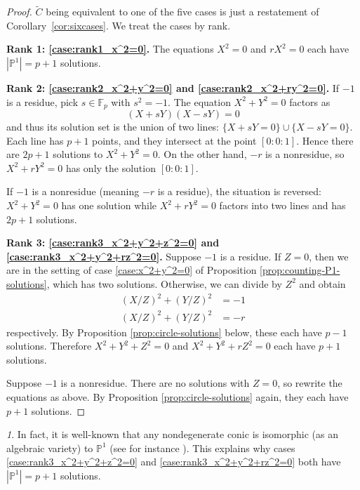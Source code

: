 \documentclass[10pt,a4paper]{amsart}
\numberwithin{equation}{section}
\numberwithin{figure}{section}
\numberwithin{table}{section}
\theoremstyle{definition}
\theoremstyle{plain}
\theoremstyle{remark}
\newtheorem*{rem*}{\protect\remarkname}
\theoremstyle{plain}
\theoremstyle{definition}
\theoremstyle{plain}
\theoremstyle{plain}
\providecommand{\remarkname}{Remark}
\renewcommand{\P}{\mathbb{P}}
\newcommand{\F}{\mathbb{F}}
\begin{document}
	\begin{proof}
		$\widetilde{C}$ being equivalent to one of the five cases is just a restatement of Corollary~\ref{cor:sixcases}. We treat the cases by rank.
		
		\noindent
		\textbf{Rank 1: \eqref{case:rank1_x^2=0}.}
		The equations $X^2 = 0$ and $rX^2 = 0$ each have $|\P^1|=p + 1$ solutions.
		
		\noindent
		\textbf{Rank 2: \eqref{case:rank2_x^2+y^2=0} and \eqref{case:rank2_x^2+ry^2=0}.} 
		If $-1$ is a residue, pick $s\in \F_p$ with $s^2 = -1$. The equation $X^2 + Y^2 = 0$ factors as
		\[
			(X + sY)(X - sY) = 0
		\]
		and thus its solution set is the union of two lines: $\{X + sY = 0\} \cup \{X - sY = 0\}$. Each line has $p+1$ points, and they intersect at the point $[0:0:1]$. Hence there are $2p+1$ solutions to $X^2 + Y^2 = 0$. On the other hand, $-r$ is a nonresidue, so $X^2 + rY^2 = 0$ has only the solution $[0:0:1]$.
		
		If $-1$ is a nonresidue (meaning $-r$ is a residue), the situation is reversed: $X^2 + Y^2 = 0$ has one
		solution while $X^2 + rY^2 = 0$ factors into two lines and has $2p + 1$ solutions.
		
		\noindent
		\textbf{Rank 3: \eqref{case:rank3_x^2+y^2+z^2=0} and \eqref{case:rank3_x^2+y^2+rz^2=0}.} 
		Suppose $-1$ is a residue. If $Z = 0$, then we are in the setting of case \eqref{case:x^2+y^2=0} of
		Proposition \ref{prop:counting-P1-solutions}, which has two
		solutions. Otherwise, we can divide by $Z^2$ and obtain 
		\begin{align*} 
		(X/Z)^2 + (Y/Z)^2 &= -1 \\ 
		(X/Z)^2 + (Y/Z)^2 &= -r 
		\end{align*} 
		respectively. By Proposition \ref{prop:circle-solutions} below, these each have $p - 1$
		solutions. Therefore $X^2 + Y^2 + Z^2 = 0$ and $X^2 + Y^2 + rZ^2 = 0$ each have
		$p+1$ solutions.
		
		Suppose $-1$ is a nonresidue. There are no solutions with $Z=0$, so rewrite the
		equations as above. By Proposition \ref{prop:circle-solutions} again, they each
		have $p + 1$ solutions.
	\end{proof}
	
	\begin{rem*}
		In fact, it is well-known that any nondegenerate conic is isomorphic (as an algebraic variety) to $\P^1$ (see for instance \cite[Prop.~19.3.1]{vakil}). This explains why cases \eqref{case:rank3_x^2+y^2+z^2=0} and \eqref{case:rank3_x^2+y^2+rz^2=0} both have $|\P^1|=p+1$ solutions.
	\end{rem*}
	
\end{document}
